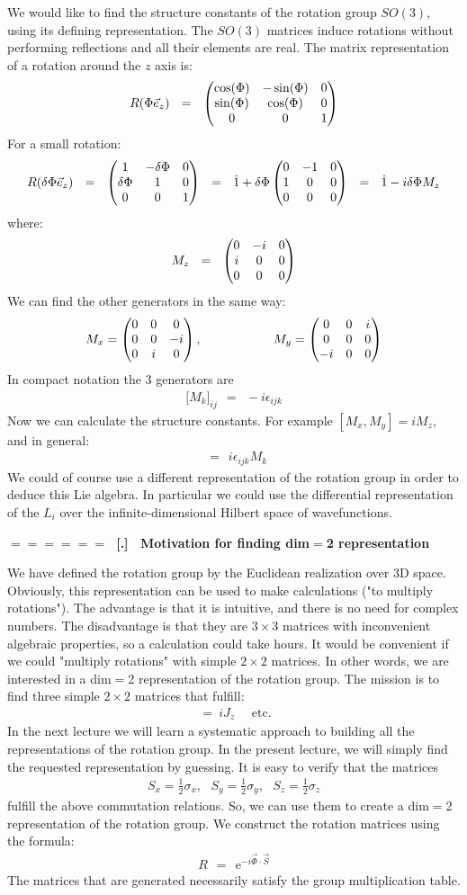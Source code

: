 \documentclass[onecolumn,fleqn]{revtex4}
\newcommand{\eexp}{\mathrm{e}^}
\newcommand{\amatrix}[1]{\begin{matrix} #1 \end{matrix}}
\newcommand{\beq}{\begin{eqnarray}}
\newcommand{\eeq}{\end{eqnarray}}
\renewcommand{\thesubsection}{\arabic{subsection}}
\renewcommand{\thesubsubsection}{\arabic{subsubsection}}
\newcommand{\sheadC}[1]
{
\addtocounter{subsubsection}{1}
\vspace{5mm}
{\Large\bf $=\!=\!=\!=\!=\!=\;$ [\thesubsection.\thesubsubsection] \ #1}  
\nopagebreak
\phantomsection
}
\begin{document}
We would like to find the structure constants 
of the rotation group ${SO(3)}$, 
using its defining representation. 
The ${SO(3)}$ matrices induce rotations without 
performing reflections and all their elements are real. 
The matrix representation of a rotation around the ${z}$ axis is:
\beq
R(\Phi\vec{e}_z)
\ \ = \ \ \left(\amatrix{ 
\cos(\Phi) & -\sin(\Phi) & 0 \cr 
\sin(\Phi) & \cos(\Phi) & 0 \cr 
0 & 0 & 1 } 
\right) 
\eeq
For a small rotation:
\beq
R(\delta\Phi\vec{e}_z) 
\ \ = \ \ \left( \amatrix{ 
1 & -\delta\Phi & 0 \cr 
\delta\Phi & 1 & 0 \cr 
0 & 0 & 1} \right) 
\ \ = \ \ \hat{1}+\delta\Phi \left( \amatrix{ 
0 & -1 & 0 \cr 
1 & 0 & 0 \cr 
0 & 0 & 0} 
\right) 
\ \ = \ \ \hat{1} -i\delta\Phi M_z 
\eeq
where:
\beq
M_z \ \ = \ \ \left( \amatrix{ 0 & -i & 0 \cr i & 0 & 0 \cr 0 & 0 & 0 } \right) 
\eeq
We can find the other generators in the same way:
\beq
M_x = \left( \amatrix{ 0 & 0 & 0 \cr 0 & 0 & -i \cr 0 & i & 0 } \right),  
\hspace{2cm}
M_y = \left( \amatrix{ 0 & 0& i \cr 0 & 0 & 0 \cr -i & 0 & 0 } \right ) 
\eeq
In compact notation the 3 generators are 
\beq
\Big[ M_k \Big]_{ij} \ \ = \ \ -i\epsilon_{ijk}
\eeq
Now we can calculate the structure constants. 
For example ${[M _ x, M_y ] = iM_z}$, and in general: 
\beq
[M_i,M_j] \ \ = \ \ i\epsilon_{ijk}M_k 
\eeq
We could of course use a different representation of the rotation group 
in order to deduce this Lie algebra. In particular we could use the 
differential representation of the $L_i$ over the infinite-dimensional 
Hilbert space of wavefunctions. 


 
\sheadC{Motivation for finding dim$=$2 representation} 

We have defined the rotation group by the Euclidean realization 
over 3D space. Obviously, this representation can be used 
to make calculations ("to multiply rotations"). The advantage 
is that it is intuitive, and there is no need for complex numbers. 
The disadvantage is that they are $3\times 3$ matrices 
with inconvenient algebraic properties, so a calculation 
could take hours. It would be convenient if we could "multiply rotations" 
with simple $2 \times 2$ matrices. In other words, we are interested 
in a dim$=$2 representation of the rotation group. The mission is to find 
three simple $2 \times 2$ matrices that fulfill:
\beq
[ J_x,J_y] \ = \ iJ_z \,\,\,\,\,\,\,\, \mbox{etc.} 
\eeq
In the next lecture we will learn a systematic approach to building 
all the representations of the rotation group. In the present lecture, 
we will simply find the requested representation by guessing. 
It is easy to verify that the matrices
\beq
S_x = \frac{1}{2}\sigma_x , 
\ \ \ S_y = \frac{1}{2}\sigma_y , 
\ \ \ S_z = \frac{1}{2}\sigma_z 
\eeq
fulfill the above commutation relations. So, we can use them 
to create a dim$=$2 representation of the rotation group. 
We construct the rotation matrices using the formula:
\beq
R \ \ = \ \ \eexp{-i \vec{\Phi} \cdot \vec{S}} 
\eeq
The matrices that are generated necessarily satisfy  
the group multiplication table. 
\end{document}
